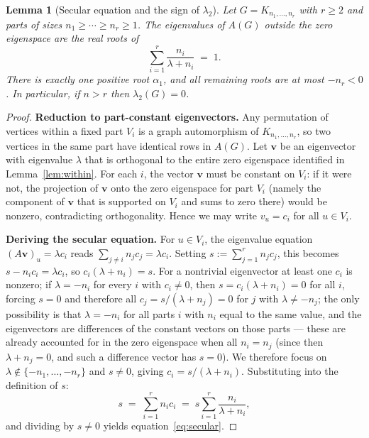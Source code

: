 \documentclass[10pt,a4paper]{amsart}
\newtheorem{lemma}{Lemma}
\begin{document}
\begin{lemma}[Secular equation and the sign of $\lambda_2$]
  \label{lem:secular}
  Let $G = K_{n_1,\ldots,n_r}$ with $r \geq 2$ and parts of sizes
  $n_1 \geq \cdots \geq n_r \geq 1$.
  The eigenvalues of $A(G)$ outside the zero eigenspace are the
  real roots of
  \begin{equation}
    \label{eq:secular}
    \sum_{i=1}^r \frac{n_i}{\lambda + n_i} \;=\; 1.
  \end{equation}
  There is exactly one positive root $\alpha_1$, and all remaining
  roots are at most $-n_r < 0$.  In particular, if $n > r$ then
  $\lambda_2(G) = 0$.
\end{lemma}

\begin{proof}
\textbf{Reduction to part-constant eigenvectors.}
Any permutation of vertices within a fixed part $V_i$ is a graph
automorphism of $K_{n_1,\ldots,n_r}$, so two vertices in the same
part have identical rows in $A(G)$.
Let $\mathbf{v}$ be an eigenvector with eigenvalue $\lambda$ that is
orthogonal to the entire zero eigenspace identified in
Lemma~\ref{lem:within}.
For each $i$, the vector $\mathbf{v}$ must be constant on $V_i$:
if it were not, the projection of $\mathbf{v}$ onto the zero eigenspace
for part $V_i$ (namely the component of $\mathbf{v}$ that is supported
on $V_i$ and sums to zero there) would be nonzero, contradicting
orthogonality.
Hence we may write $v_u = c_i$ for all $u \in V_i$.

\textbf{Deriving the secular equation.}
For $u \in V_i$, the eigenvalue equation $(A\mathbf{v})_u = \lambda c_i$
reads $\sum_{j \neq i} n_j c_j = \lambda c_i$.
Setting $s := \sum_{j=1}^r n_j c_j$, this becomes $s - n_i c_i = \lambda c_i$,
so $c_i(\lambda + n_i) = s$.
For a nontrivial eigenvector at least one $c_i$ is nonzero; if $\lambda = -n_i$
for every $i$ with $c_i \neq 0$, then $s = c_i(\lambda + n_i) = 0$ for
all $i$, forcing $s = 0$ and therefore all $c_j = s/(\lambda+n_j) = 0$
for $j$ with $\lambda \neq -n_j$; the only possibility is that $\lambda = -n_i$
for all parts $i$ with $n_i$ equal to the same value, and the eigenvectors
are differences of the constant vectors on those parts --- these are already
accounted for in the zero eigenspace when all $n_i = n_j$ (since then
$\lambda + n_j = 0$, and such a difference vector has $s = 0$).
We therefore focus on $\lambda \notin \{-n_1,\ldots,-n_r\}$ and $s \neq 0$,
giving $c_i = s/(\lambda + n_i)$.
Substituting into the definition of $s$:
\[
  s
  \;=\; \sum_{i=1}^r n_i c_i
  \;=\; s \sum_{i=1}^r \frac{n_i}{\lambda + n_i},
\]
and dividing by $s \neq 0$ yields equation~\eqref{eq:secular}.


\end{proof}
\end{document}
